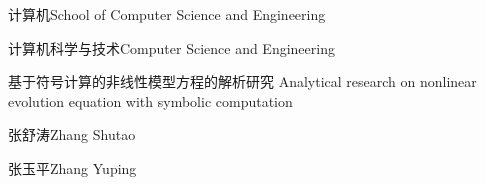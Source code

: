 
\school
{计算机}{School of Computer Science and Engineering}

\major
{计算机科学与技术}{Computer Science and Engineering}

\thesistitle
{基于符号计算的非线性模型方程的解析研究}
{ }
{Analytical research on nonlinear evolution equation with symbolic computation}

\thesisauthor
{张舒涛}{Zhang Shutao}

\teacher
{张玉平}{Zhang Yuping}


\thesisbegin{\ \ \ \ \ \ \ \ }{\ \ \ \ }{\ \ \ \ }

\thesisend{\ \ \ \ \ \ \ \ }{\ \ \ \ }{\ \ \ \ }



